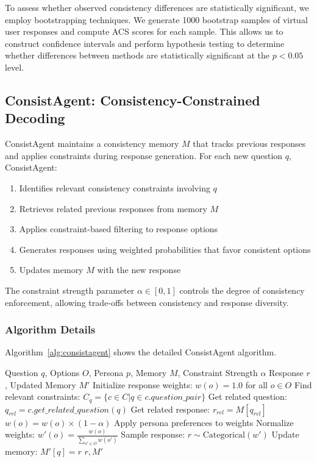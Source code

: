 \documentclass[sigconf, anonymous]{acmart}
\begin{document}
To assess whether observed consistency differences are statistically significant, we employ bootstrapping techniques. We generate 1000 bootstrap samples of virtual user responses and compute ACS scores for each sample. This allows us to construct confidence intervals and perform hypothesis testing to determine whether differences between methods are statistically significant at the $p < 0.05$ level.

\subsection{ConsistAgent: Consistency-Constrained Decoding}

ConsistAgent maintains a consistency memory $M$ that tracks previous responses and applies constraints during response generation. For each new question $q$, ConsistAgent:

\begin{enumerate}
    \item Identifies relevant consistency constraints involving $q$
    \item Retrieves related previous responses from memory $M$
    \item Applies constraint-based filtering to response options
    \item Generates responses using weighted probabilities that favor consistent options
    \item Updates memory $M$ with the new response
\end{enumerate}

The constraint strength parameter $\alpha \in [0,1]$ controls the degree of consistency enforcement, allowing trade-offs between consistency and response diversity.

\subsubsection{Algorithm Details}

Algorithm~\ref{alg:consistagent} shows the detailed ConsistAgent algorithm.

\begin{algorithm}[h]
\caption{ConsistAgent Algorithm}
\label{alg:consistagent}
\begin{algorithmic}[1]
\REQUIRE Question $q$, Options $O$, Persona $p$, Memory $M$, Constraint Strength $\alpha$
\ENSURE Response $r$, Updated Memory $M'$
\STATE Initialize response weights: $w(o) = 1.0$ for all $o \in O$
\STATE Find relevant constraints: $C_q = \{c \in C | q \in c.question\_pair\}$
    \STATE Get related question: $q_{rel} = c.get\_related\_question(q)$
        \STATE Get related response: $r_{rel} = M[q_{rel}]$
                \STATE $w(o) = w(o) \times (1 - \alpha)$
            \ENDIF
        \ENDFOR
    \ENDIF
\ENDFOR
\STATE Apply persona preferences to weights
\STATE Normalize weights: $w'(o) = \frac{w(o)}{\sum_{o' \in O} w(o')}$
\STATE Sample response: $r \sim \text{Categorical}(w')$
\STATE Update memory: $M'[q] = r$
\RETURN $r, M'$
\end{algorithmic}
\end{algorithm}
\end{document}
